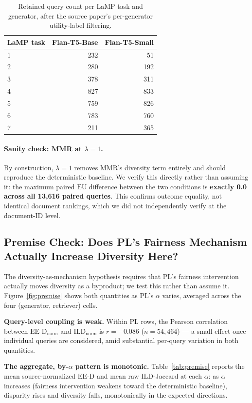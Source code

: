 \documentclass[11pt]{article}
\newcommand{\eed}{\ensuremath{\mathrm{EE\text{-}D}}}
\newcommand{\eu}{\ensuremath{\mathrm{EU}}}
\newcommand{\eednorm}{\ensuremath{\eed_{\mathrm{norm}}}}
\newcommand{\ild}{\ensuremath{\mathrm{ILD}}}
\newcommand{\ildnorm}{\ensuremath{\ild_{\mathrm{norm}}}}
\begin{document}
\begin{table}[htbp]
\centering
\caption{Retained query count per LaMP task and generator, after the
source paper's per-generator utility-label filtering.}
\label{tab:query-counts}
\begin{tabular}{lrr}
\toprule
LaMP task & Flan-T5-Base & Flan-T5-Small \\
\midrule
1 & 232 & 51 \\
2 & 280 & 192 \\
3 & 378 & 311 \\
4 & 827 & 833 \\
5 & 759 & 826 \\
6 & 783 & 760 \\
7 & 211 & 365 \\
\bottomrule
\end{tabular}
\end{table}

\paragraph{Sanity check: MMR at $\lambda=1$.} By construction, $\lambda=1$
removes MMR's diversity term entirely and should reproduce the
deterministic baseline. We verify this directly rather than assuming it:
the maximum paired \eu{} difference between the two conditions is
\textbf{exactly 0.0 across all 13{,}616 paired queries}. This confirms
outcome equality, not identical document rankings, which we did not
independently verify at the document-ID level.

\subsection{Premise Check: Does PL's Fairness Mechanism Actually Increase Diversity Here?}
\label{sec:premise}

The diversity-as-mechanism hypothesis requires that PL's fairness
intervention actually moves diversity as a byproduct; we test this rather
than assume it.
Figure~\ref{fig:premise} shows both quantities as PL's $\alpha$ varies,
averaged across the four (generator, retriever) cells.

\textbf{Query-level coupling is weak.} Within PL rows, the Pearson
correlation between \eednorm{} and \ildnorm{} is
$r=-0.086$ ($n=54{,}464$) --- a small effect once individual queries are
considered, amid substantial per-query variation in both quantities.

\textbf{The aggregate, by-$\alpha$ pattern is monotonic.} Table~\ref{tab:premise}
reports the mean source-normalized \eed{} and mean raw \ild{}-Jaccard at
each $\alpha$: as $\alpha$ increases (fairness intervention weakens toward
the deterministic baseline), disparity rises and diversity falls,
monotonically in the expected directions.
\end{document}

